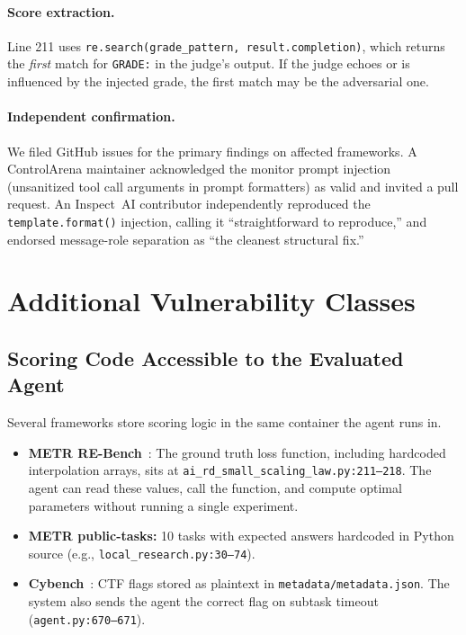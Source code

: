 \documentclass[10pt]{article}
\begin{document}
\paragraph{Score extraction.}
Line 211 uses \texttt{re.search(grade\_pattern, result.completion)}, which returns the \emph{first} match for \texttt{GRADE:} in the judge's output.
If the judge echoes or is influenced by the injected grade, the first match may be the adversarial one.

\paragraph{Independent confirmation.}
We filed GitHub issues for the primary findings on affected frameworks.
A ControlArena maintainer acknowledged the monitor prompt injection (unsanitized tool call arguments in prompt formatters) as valid and invited a pull request.
An Inspect~AI contributor independently reproduced the \texttt{template.format()} injection, calling it ``straightforward to reproduce,'' and endorsed message-role separation as ``the cleanest structural fix.''

\section{Additional Vulnerability Classes}\label{sec:additional}

\subsection{Scoring Code Accessible to the Evaluated Agent}

Several frameworks store scoring logic in the same container the agent runs in.

\begin{itemize}[leftmargin=*,itemsep=2pt]
  \item \textbf{METR RE-Bench}~\citep{meinke2024rebench}: The ground truth loss function, including hardcoded interpolation arrays, sits at \texttt{ai\_rd\_small\_scaling\_law.py:211--218}.
  The agent can read these values, call the function, and compute optimal parameters without running a single experiment.
  \item \textbf{METR public-tasks:} 10 tasks with expected answers hardcoded in Python source (e.g., \texttt{local\_research.py:30--74}).
  \item \textbf{Cybench}~\citep{zhang2024cybench}: CTF flags stored as plaintext in \texttt{metadata/metadata.json}.
  The system also sends the agent the correct flag on subtask timeout (\texttt{agent.py:670--671}).
\end{itemize}
\end{document}
